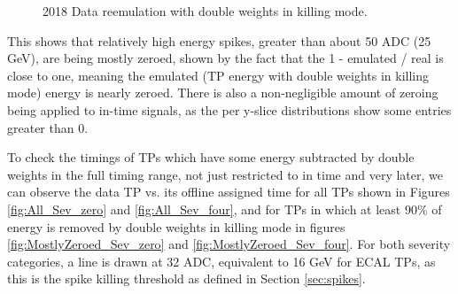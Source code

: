 \begin{figure}[H]%
    \setcounter{subfigure}{0}
    \centering
    \hfill
    \caption{2018 Data reemulation with double weights in killing mode. \label{fig:2018Reemulation_KillingMode}}%
\end{figure}

This shows that relatively high energy spikes, greater than about 50 ADC (25 GeV), are being mostly zeroed, shown by the fact that the 1 - emulated / real is close to one, meaning the emulated (TP energy with double weights in killing mode) energy is nearly zeroed. There is also a non-negligible amount of zeroing being applied to in-time signals, as the per y-slice distributions show some entries greater than 0. 

To check the timings of TPs which have some energy subtracted by double weights in the full timing range, not just restricted to in time and very later, we can observe the data TP vs. its offline assigned time for all TPs shown in Figures \ref{fig:All_Sev_zero} and \ref{fig:All_Sev_four}, and for TPs in which at least 90\% of energy is removed by double weights in killing mode in figures \ref{fig:MostlyZeroed_Sev_zero} and \ref{fig:MostlyZeroed_Sev_four}. For both severity categories, a line is drawn at 32 ADC, equivalent to 16 GeV for ECAL TPs, as this is the spike killing threshold as defined in Section \ref{sec:spikes}. 

